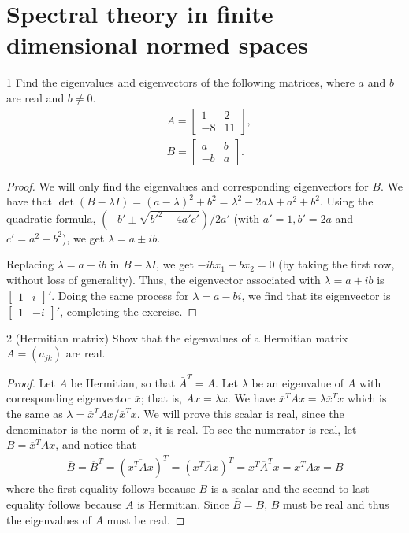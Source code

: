 \section{Spectral theory in finite dimensional normed spaces}


\begin{exercise}{1}
Find the eigenvalues and eigenvectors of the following matrices, where $a$ and $b$ are real and $b \neq 0$.
\begin{align*}
    &A = 
    \begin{bmatrix}
        1 & 2\\
        -8 & 11
    \end{bmatrix},\\
    &B =
    \begin{bmatrix}
        a & b\\
        -b & a
    \end{bmatrix}.
\end{align*}
\end{exercise}
\begin{proof}
We will only find the eigenvalues and corresponding eigenvectors for $B$.
We have that $\det(B - \lambda I) = (a-\lambda)^2 + b^2 = \lambda^2 - 2a\lambda + a^2 + b^2$. 
Using the quadratic formula, $(-b' \pm \sqrt{b'^2 - 4a'c'})/2a'$ (with $a' = 1, b' = 2a$ and $c' = a^2 + b^2$), we get $\lambda = a \pm ib$.

Replacing $\lambda = a + ib$ in $B - \lambda I$, we get $-ib x_1 + b x_2 = 0$ (by taking the first row, without loss of generality).
Thus, the eigenvector associated with $\lambda = a + ib$ is $\begin{bmatrix} 1 & i \end{bmatrix}'$.
Doing the same process for $\lambda = a - bi$, we find that its eigenvector is $\begin{bmatrix} 1 & -i \end{bmatrix}'$, completing the exercise.
\end{proof} 

\begin{exercise}{2 (Hermitian matrix)}
Show that the eigenvalues of a Hermitian matrix $A = (a_{jk})$ are real.
\end{exercise}
\begin{proof}
Let $A$ be Hermitian, so that $\bar{A}^T = A$.
Let $\lambda$ be an eigenvalue of $A$ with corresponding eigenvector $\overline{x}$;
that is, $A x = \lambda x$.
We have $\overline{x}^T A x = \lambda \overline{x}^T x$ which is the same as $\lambda = \overline{x}^T A x / \overline{x}^T x$.
We will prove this scalar is real, since the denominator is the norm of $x$, it is real.
To see the numerator is real, let $B = \overline{x}^T A x$, and notice that 
\begin{align*}
    \overline{B} 
    = \overline{B}^T 
    = (\overline{\overline{x}^T A x})^T 
    = (x^T \overline{A} \overline{x})^T
    = \overline{x}^T \overline{A}^T x
    = \overline{x}^T A x
    = B
\end{align*}
where the first equality follows because $B$ is a scalar and the second to last equality follows because $A$ is Hermitian.
Since $\overline{B} = B $, $B$ must be real and thus the eigenvalues of $A$ must be real.
\end{proof} 

